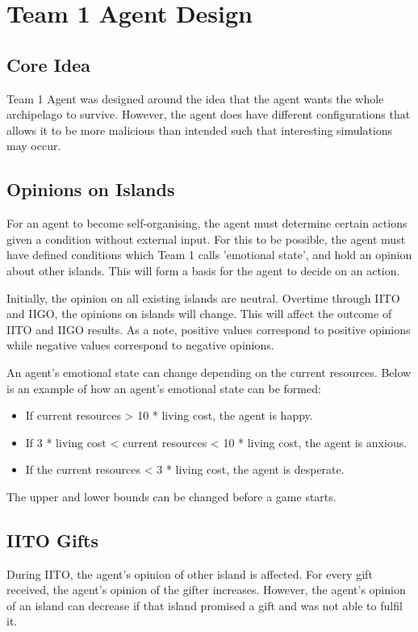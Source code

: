 \chapter{Team 1 Agent Design}

\section{Core Idea}
Team 1 Agent was designed around the idea that the agent wants the whole archipelago to survive. However, the agent does have different configurations that allows it to be more malicious than intended such that interesting simulations may occur.

\section{Opinions on Islands}
For an agent to become self-organising, the agent must determine certain actions given a condition without external input. For this to be possible, the agent must have defined conditions which Team 1 calls 'emotional state', and hold an opinion about other islands. This will form a basis for the agent to decide on an action.

Initially, the opinion on all existing islands are neutral. Overtime through IITO and IIGO, the opinions on islands will change. This will affect the outcome of IITO and IIGO results. As a note, positive values correspond to positive opinions while negative values correspond to negative opinions.

An agent's emotional state can change depending on the current resources. Below is an example of how an agent's emotional state can be formed:
\begin{itemize}
    \item If current resources > 10 * living cost, the agent is happy.
    \item If 3 * living cost < current resources < 10 * living cost, the agent is anxious.
    \item If the current resources < 3 * living cost, the agent is desperate.
\end{itemize}
The upper and lower bounds can be changed before a game starts. 

\section{IITO Gifts}
During IITO, the agent's opinion of other island is affected. For every gift received, the agent's opinion of the gifter increases. However, the agent's opinion of an island can decrease if that island promised a gift and was not able to fulfil it. 

